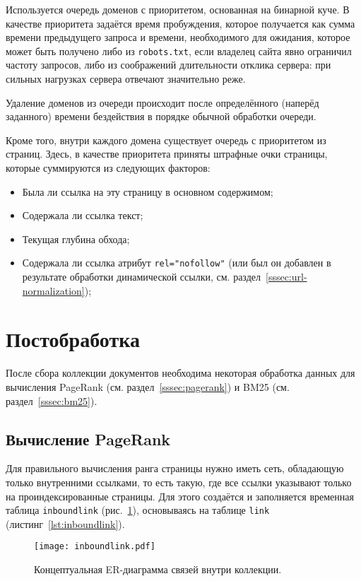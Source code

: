 Используется очередь доменов с приоритетом, основанная на бинарной куче. В качестве приоритета задаётся время пробуждения, которое получается как сумма времени предыдущего запроса и времени, необходимого для ожидания, которое может быть получено либо из \verb|robots.txt|, если владелец сайта явно ограничил частоту запросов, либо из соображений длительности отклика сервера: при сильных нагрузках сервера отвечают значительно реже.

Удаление доменов из очереди происходит после определённого (наперёд заданного) времени бездействия в порядке обычной обработки очереди.

Кроме того, внутри каждого домена существует очередь с приоритетом из страниц. Здесь, в качестве приоритета приняты штрафные очки страницы, которые суммируются из следующих факторов:
\begin{itemize}
  \item Была ли ссылка на эту страницу в основном содержимом;
  \item Содержала ли ссылка текст;
  \item Текущая глубина обхода;
  \item Содержала ли ссылка атрибут \verb|rel="nofollow"| (или был он добавлен в результате обработки динамической ссылки, см. раздел~\ref{sssec:url-normalization});
\end{itemize}


\section{Постобработка}
После сбора коллекции документов необходима некоторая обработка данных для вычисления PageRank (см. раздел~\ref{sssec:pagerank}) и BM25 (см. раздел~\ref{sssec:bm25}).


\subsection{Вычисление PageRank}
Для правильного вычисления ранга страницы нужно иметь сеть, обладающую только внутренними ссылками, то есть такую, где все ссылки указывают только на проиндексированные страницы. Для этого создаётся и заполняется временная таблица \verb|inboundlink| (рис.~\ref{fig:inboundlink}), основываясь на таблице \verb|link| (листинг~\ref{lst:inboundlink}).
\begin{figure}[h]
  \centering
  \texttt{[image: inboundlink.pdf]}
  \caption{Концептуальная ER-диаграмма связей внутри коллекции.}
  \label{fig:inboundlink}
\end{figure}

